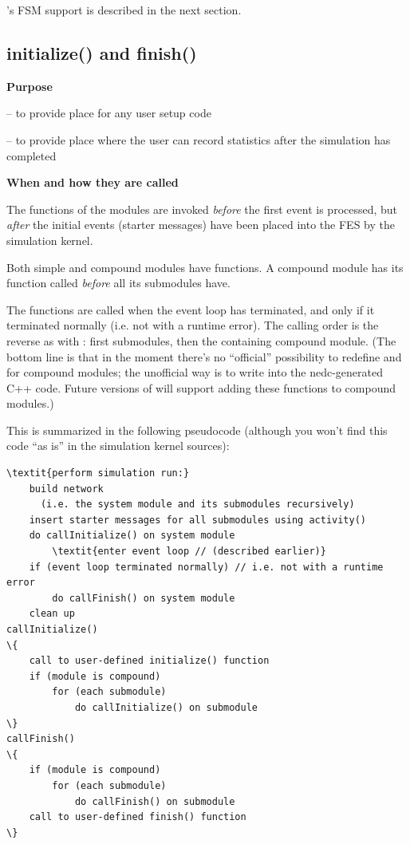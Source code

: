 {\opp}'s FSM support is described in the next section.



\subsection{initialize() and finish()}

\textbf{Purpose}


 -- to provide place for any user setup code

 -- to provide place where the user can record statistics
after the simulation has completed


\textbf{When and how they are called}


The  functions of the modules are invoked
\textit{before} the first event is processed, but \textit{after} the
initial events (starter messages) have been
placed into the FES by the simulation kernel.


Both simple and compound modules have  functions.
A compound module has its  function called
\textit{before} all its submodules have.


The  functions are called when the event
loop has terminated, and only if it terminated
normally (i.e. not with a runtime error).  The calling order is the
reverse as with : first submodules, then the
containing compound module. (The bottom line is that in the moment
there's no ``official'' possibility to redefine 
and  for compound modules; the unofficial way is to
write into the nedc-generated C++ code. Future versions of {\opp} will
support adding these functions to compound
modules.)

This is summarized in the following pseudocode (although you
won't find this code ``as is'' in the simulation
kernel sources):


\begin{Verbatim}[commandchars=\\\{\}]
\textit{perform simulation run:}
    build network
      (i.e. the system module and its submodules recursively)
    insert starter messages for all submodules using activity()
    do callInitialize() on system module
        \textit{enter event loop // (described earlier)}
    if (event loop terminated normally) // i.e. not with a runtime
error
        do callFinish() on system module
    clean up
callInitialize()
\{
    call to user-defined initialize() function
    if (module is compound)
        for (each submodule)
            do callInitialize() on submodule
\}
callFinish()
\{
    if (module is compound)
        for (each submodule)
            do callFinish() on submodule
    call to user-defined finish() function
\}
\end{Verbatim}



